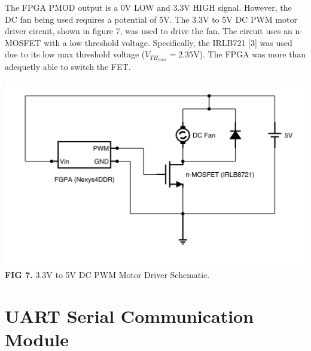 \documentclass{article}
\begin{document}
The FPGA PMOD output is a 0V LOW and 3.3V HIGH signal. However, the DC fan being used requires a potential of 5V. The 3.3V to 5V DC PWM motor driver circuit, shown in figure 7, was used to drive the fan. The circuit uses an n-MOSFET with a low threshold voltage. Specifically, the IRLB721 [3] was used due to its low max threshold voltage ($V_{TH_{max}}=2.35$V). The FPGA was more than adequetly able to switch the FET.

\begin{center}
\includegraphics[scale=.5]{images/pwmSchematic-nowords}\\
\textbf{FIG 7.} 3.3V to 5V DC PWM Motor Driver Schematic.\\
\end{center}
\section{UART Serial Communication Module}
\end{document}
